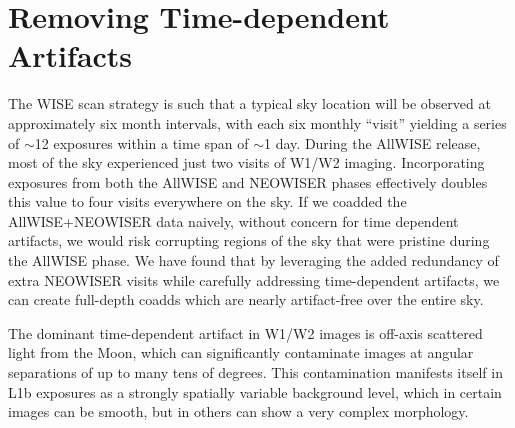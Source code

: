 \documentclass{emulateapj}
\begin{document}

\section{Removing Time-dependent Artifacts}
\label{sec:moon}

The WISE scan strategy is such that a typical sky location will be 
observed at approximately six month intervals, with each six monthly
``visit'' yielding a series of $\sim$12 exposures within a time span of $\sim$1
day. During the AllWISE release, most of the sky experienced just two visits
of W1/W2 imaging. Incorporating exposures from both the AllWISE and
NEOWISER phases effectively doubles this value to four visits everywhere
on the sky. If we coadded the AllWISE+NEOWISER data naively, without
concern for time dependent artifacts, we would risk corrupting regions of the 
sky that were pristine during the AllWISE phase. We have found that by 
leveraging the added redundancy of extra NEOWISER visits while carefully 
addressing time-dependent artifacts, we can create full-depth coadds which are 
nearly artifact-free over the entire sky.

The dominant time-dependent artifact in W1/W2 images is off-axis
scattered light from the Moon, which can significantly contaminate
images at angular separations of up to many tens of degrees. This
contamination manifests itself in L1b exposures as a strongly spatially 
variable background level, which in certain images can be smooth, but in
others can show a very complex morphology.

\begin{figure*} [ht]
 \begin{center}
  \caption{\label{fig:moon_3433p000} Tile 3433p000, a 
           1.5$^{\circ}$$\times$1.5$^{\circ}$ region of sky at low
           ecliptic latitude which experienced strong Moon contamination 
           during the AllWISE mission phase. Rejecting Moon-contaminated
           frames as described in \ref{sec:moon} while including
           two extra visits worth of NEOWISER data has dramatically
           improved the background level uniformity relative to the
           \cite{lang14} version of this tile. For this tile, we were
           able to recover 58\% (18\%) of frames in W1 (W2).}
 \end{center}
\end{figure*}
\end{document}
